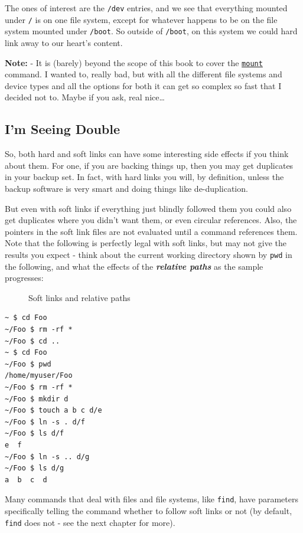\documentclass[10pt,]{book}
\numberwithin{figure}{chapter}
\DeclareRobustCommand{\drcap}[1]{\begin{figure}[H]\caption{#1}\end{figure}}
\DeclareRobustCommand{\drcmd}[1]{\index{Commands!#1}}
\begin{document}
The ones of interest are the \texttt{/dev} entries, and we see that
everything mounted under \texttt{/} is on one file system, except for
whatever happens to be on the file system mounted under \texttt{/boot}.
So outside of \texttt{/boot}, on this system we could hard link away to
our heart's content.

\textbf{Note:} - It is (barely) beyond the scope of this book to cover
the \href{http://linux.die.net/man/8/mount}{\texttt{mount}}\drcmd{mount}
command. I wanted to, really bad, but with all the different file
systems and device types and all the options for both it can get so
complex so fast that I decided not to. Maybe if you ask, real
nice\ldots{}

\subsection{I'm Seeing Double}\label{im-seeing-double}

So, both hard and soft links can
have some interesting side effects if you think about them. For one, if
you are backing things up, then you may get duplicates in your backup
set. In fact, with hard links you will, by definition, unless the backup
software is very smart and doing things like de-duplication.

But even with soft links if everything just blindly followed them you
could also get duplicates where you didn't want them, or even circular
references. Also, the pointers in the soft link files are not evaluated
until a command references them. Note that the following is perfectly
legal with soft links, but may not give the results you expect - think
about the current working directory shown by \texttt{pwd}\drcmd{pwd} in
the following, and what the effects of the \textbf{\emph{relative
paths}} as the sample progresses:

\drcap{Soft links and relative paths}

\begin{verbatim}
~ $ cd Foo
~/Foo $ rm -rf *
~/Foo $ cd ..
~ $ cd Foo
~/Foo $ pwd
/home/myuser/Foo
~/Foo $ rm -rf *
~/Foo $ mkdir d
~/Foo $ touch a b c d/e
~/Foo $ ln -s . d/f
~/Foo $ ls d/f
e  f
~/Foo $ ln -s .. d/g
~/Foo $ ls d/g
a  b  c  d
\end{verbatim}

Many commands that deal with files and file systems, like
\texttt{find}\drcmd{find}, have parameters specifically telling the
command whether to follow soft links or not (by default, \texttt{find}
does not - see the next chapter for more).
\end{document}
